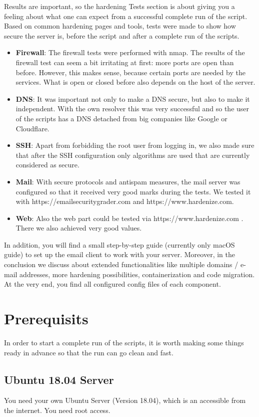 Results are important, so the hardening Tests section is about giving you a feeling about what one can expect from a successful complete run of the script. Based on common hardening pages and tools, tests were made to show how secure the server is, before the script and after a complete run of the scripts. 
\begin{itemize} 
	\item \textbf{Firewall}: The firewall tests were performed with nmap. The results of the firewall test can seem a bit irritating at first: more ports are open than before. However, this makes sense, because certain ports are needed by the services. What is open or closed before also depends on the host of the server.
	\item \textbf{DNS}: It was important not only to make a DNS secure, but also to make it  independent. With the own resolver this was very successful and so the user of the scripts has a DNS detached from big companies like Google or Cloudflare.
	\item \textbf{SSH}: Apart from forbidding the root user from logging in, we also made sure that after the SSH configuration only algorithms are used that are currently considered as secure.
	\item \textbf{Mail}: With secure protocols and antispam measures, the mail server was configured so that it received very good marks during the tests. We tested it with https://emailsecuritygrader.com and https://www.hardenize.com.
	\item \textbf{Web}: Also the web part could be tested via https://www.hardenize.com .  There we also achieved very good values.
\end{itemize}
In addition, you will find a small step-by-step guide (currently only macOS guide) to set up the email client to work with your server. Moreover, in the conclusion we discuss about extended functionalities like multiple domains / e-mail addresses, more hardening possibilities, containerization and code migration. At the very end, you find all configured config files of each component.


\section{Prerequisits}
In order to start a complete run of the scripts, it is worth making some things ready in advance so that the run can go clean and fast.

\subsection{Ubuntu 18.04 Server}
You need your own Ubuntu Server (Version 18.04), which is an accessible from the internet. You need root access.

